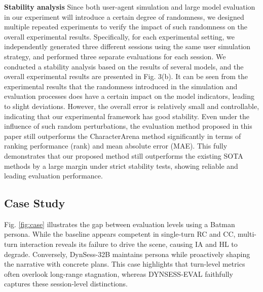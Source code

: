 \textbf{Stability analysis}
Since both user-agent simulation and large model evaluation in our experiment will introduce a certain degree of randomness, we designed multiple repeated experiments to verify the impact of such randomness on the overall experimental results. Specifically, for each experimental setting, we independently generated three different sessions using the same user simulation strategy, and performed three separate evaluations for each session. We conducted a stability analysis based on the results of several models, and the overall experimental results are presented in Fig. 3(b).
It can be seen from the experimental results that the randomness introduced in the simulation and evaluation processes does have a certain impact on the model indicators, leading to slight deviations. However, the overall error is relatively small and controllable, indicating that our experimental framework has good stability. Even under the influence of such random perturbations, the evaluation method proposed in this paper still outperforms the CharacterArena method significantly in terms of ranking performance (rank) and mean absolute error (MAE). This fully demonstrates that our proposed method still outperforms the existing SOTA methods by a large margin under strict stability tests, showing reliable and leading evaluation performance.




\subsection{Case Study}

Fig. \ref{fig:case} illustrates the gap between evaluation levels using a Batman persona. While the baseline appears competent in single-turn RC and CC, multi-turn interaction reveals its failure to drive the scene, causing IA and HL to degrade. Conversely, DynSess-32B maintains persona while proactively shaping the narrative with concrete plans. This case highlights that turn-level metrics often overlook long-range stagnation, whereas DYNSESS-EVAL faithfully captures these session-level distinctions.





